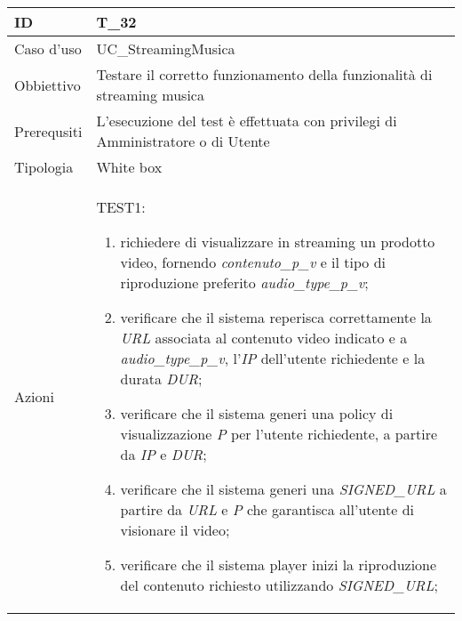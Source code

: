 \begin{table}[hb]
    \centering
    \begin{tabular}{ |p{2cm}|p{10cm}|  }
        \hline
        ID          & T\_32                                                                          \\\hline
        Caso d'uso  & UC\_StreamingMusica                                                            \\\hline
        Obbiettivo  & Testare il corretto funzionamento della funzionalità di streaming musica       \\\hline
        Prerequsiti & L'esecuzione del test è effettuata con privilegi di Amministratore o di Utente \\\hline
        Tipologia   & White box                                                                      \\\hline
        Azioni      &
        TEST1:
        \begin{enumerate}[nosep, topsep=0pt]
            \item richiedere di visualizzare in streaming un prodotto video, fornendo \emph{contenuto\_p\_v} e il tipo di riproduzione preferito \emph{audio\_type\_p\_v};
            \item verificare che il sistema reperisca correttamente la \emph{URL} associata al contenuto video indicato e a \emph{audio\_type\_p\_v}, l'\emph{IP} dell'utente richiedente e la durata \emph{DUR};
            \item verificare che il sistema generi una policy di visualizzazione \emph{P} per l'utente richiedente, a partire da \emph{IP} e \emph{DUR};
            \item verificare che il sistema generi una \emph{SIGNED\_URL} a partire da \emph{URL} e \emph{P} che garantisca all'utente di visionare il video;
            \item verificare che il sistema player inizi la riproduzione del contenuto richiesto utilizzando \emph{SIGNED\_URL};
        \end{enumerate}
        \\\hline
    \end{tabular}
\end{table}














